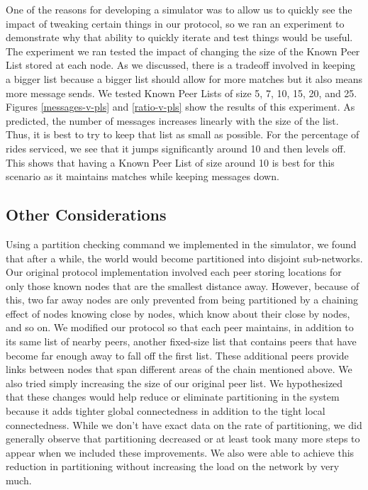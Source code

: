 \documentclass[letterpaper,11pt,twocolumn]{article}
\begin{document}
One of the reasons for developing a simulator was to allow us to quickly see the impact of tweaking certain things in our protocol, so we ran an experiment to demonstrate why that ability to quickly iterate and test things would be useful. The experiment we ran tested the impact of changing the size of the Known Peer List stored at each node. As we discussed, there is a tradeoff involved in keeping a bigger list because a bigger list should allow for more matches but it also means more message sends. We tested Known Peer Lists of size 5, 7, 10, 15, 20, and 25. Figures \ref{messages-v-pls} and \ref{ratio-v-pls} show the results of this experiment. As predicted, the number of messages increases linearly with the size of the list. Thus, it is best to try to keep that list as small as possible. For the percentage of rides serviced, we see that it jumps significantly around 10 and then levels off. This shows that having a Known Peer List of size around 10 is best for this scenario as it maintains matches while keeping messages down.

\subsection{Other Considerations}
Using a partition checking command we implemented in the simulator, we found that after a while, the world would become partitioned into disjoint sub-networks. Our original protocol implementation involved each peer storing locations for only those known nodes that are the smallest distance away. However, because of this, two far away nodes are only prevented from being partitioned by a chaining effect of nodes knowing close by nodes, which know about their close by nodes, and so on. We modified our protocol so that each peer maintains, in addition to its same list of nearby peers, another fixed-size list that contains peers that have become far enough away to fall off the first list. These additional peers provide links between nodes that span different areas of the chain mentioned above. We also tried simply increasing the size of our original peer list. We hypothesized that these changes would help reduce or eliminate partitioning in the system because it adds tighter global connectedness in addition to the tight local connectedness. While we don’t have exact data on the rate of partitioning, we did generally observe that partitioning decreased or at least took many more steps to appear when we included these improvements. We also were able to achieve this reduction in partitioning without increasing the load on the network by very much.
\end{document}

